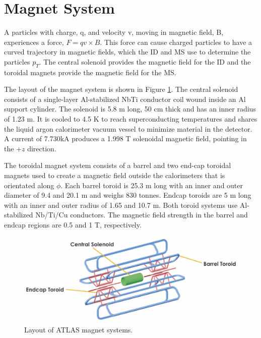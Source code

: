 \section{Magnet System}
A particles with charge, q, and velocity v, moving in magnetic field, B, experiences a force, $F= qv\times B$. This force can cause charged particles to have a curved trajectory in magnetic fields, which the ID and MS use to determine the particles $p_{T}$. The central solenoid provides the magnetic field for the ID and the toroidal magnets provide the magnetic field for the MS.

The layout of the magnet system is shown in Figure \ref{fig:atlas_magnets}. The central solenoid consists of a single-layer Al-stabilized NbTi conductor coil wound inside an Al support cylinder. The solenoid is 5.8 m long, 50 cm thick and has an inner radius of 1.23 m. It is cooled to 4.5 K to reach superconducting temperatures and shares the liquid argon calorimeter vacuum vessel to minimize material in the detector. A current of 7.730kA produces a 1.998 T solenoidal magnetic field, pointing in the +$z$ direction. 

The toroidal magnet system consists of a barrel and two end-cap toroidal magnets used to create a magnetic field outside the calorimeters that is orientated along $\phi$. Each barrel toroid is 25.3 m long with an inner and outer diameter of 9.4 and 20.1 m and weighs 830 tonnes. Endcap toroids are 5 m long with an inner and outer radius of 1.65 and 10.7 m. Both toroid systems use Al-stabilized Nb/Ti/Cu conductors. The magnetic field strength in the barrel and endcap regions are 0.5 and 1 T, respectively.

\begin{figure}[h!]
  \centering
  \includegraphics[width=\hsize]{figures/Detector/atlas_magnets.png}
  \caption{Layout of ATLAS magnet systems.} 
  \label{fig:atlas_magnets}
\end{figure}
\FloatBarrier


